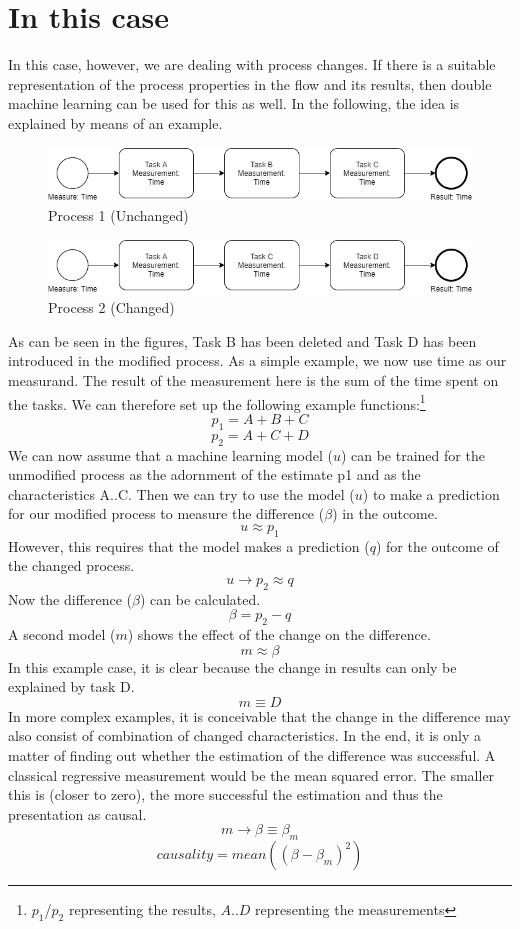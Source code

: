     \section{In this case}
    In this case, however, we are dealing with process changes. If there is a suitable representation of the process properties in the flow and its results, then double machine learning can be used for this as well. In the following, the idea is explained by means of an example.
    \begin{figure}[H]
        \centering
        \includegraphics[width=0.99\textwidth-2\fboxsep-2\fboxrule]{includes/p1.png}
        \caption{Process 1 (Unchanged)}
        \label{p1}
    \end{figure}
    \begin{figure}[H]
        \centering
        \includegraphics[width=0.99\textwidth-2\fboxsep-2\fboxrule]{includes/p2.png}
        \caption{Process 2 (Changed)}
        \label{p2}
    \end{figure}
    As can be seen in the figures, Task B has been deleted and Task D has been introduced in the modified process. As a simple example, we now use time as our measurand. The result of the measurement here is the sum of the time spent on the tasks. We can therefore set up the following example functions:\footnote{$p_1$/$p_2$ representing the results, $A$..$D$ representing the measurements}\\
    \[p_1 = A + B + C\]
    \[p_2 = A + C + D\]
    We can now assume that a machine learning model ($u$) can be trained for the unmodified process as the adornment of the estimate p1 and as the characteristics A..C. Then we can try to use the model ($u$) to make a prediction for our modified process to measure the difference ($\beta$) in the outcome.
    \[u \approx p_1\]
    However, this requires that the model makes a prediction ($q$) for the outcome of the changed process.
    \[u \rightarrow p_2 \approx q\]
    Now the difference ($\beta$) can be calculated.
    \[\beta = p_2 - q\]
    A second model ($m$) shows the effect of the change on the difference.
    \[m \approx \beta\]
    In this example case, it is clear because the change in results can only be explained by task D.
    \[m \equiv D\]
    In more complex examples, it is conceivable that the change in the difference may also consist of combination of changed characteristics. In the end, it is only a matter of finding out whether the estimation of the difference was successful. A classical regressive measurement would be the mean squared error. The smaller this is (closer to zero), the more successful the estimation and thus the presentation as causal.
    \[m \rightarrow \beta \equiv \beta_m\]
    \[causality = mean((\beta-\beta_m)^2)\]
\clearpage

